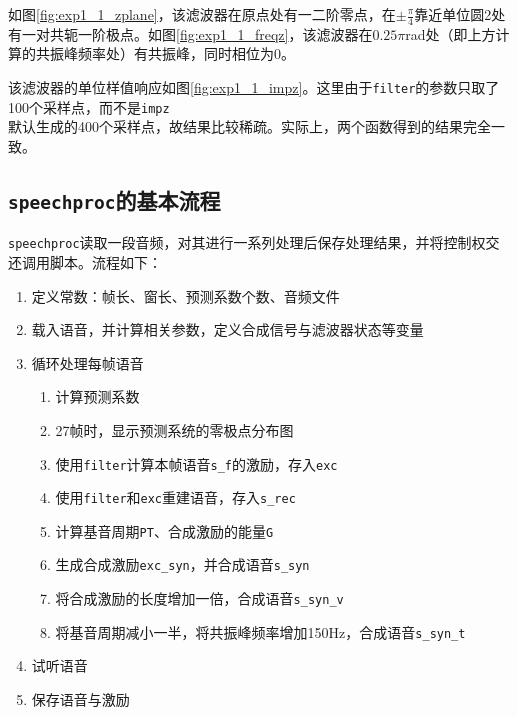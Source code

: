\documentclass[10pt, a4paper]{article}
\begin{document}
如图\ref{fig:exp1_1_zplane}，该滤波器在原点处有一二阶零点，在$\pm\frac{\pi}{4}$靠近单位圆2处有一对共轭一阶极点。如图\ref{fig:exp1_1_freqz}，该滤波器在$0.25\pi$rad处（即上方计算的共振峰频率处）有共振峰，同时相位为0。

该滤波器的单位样值响应如图\ref{fig:exp1_1_impz}。这里由于\texttt{filter}的参数只取了100个采样点，而不是\texttt{impz}\\默认生成的400个采样点，故结果比较稀疏。实际上，两个函数得到的结果完全一致。

\subsection{\texttt{speechproc}的基本流程}

\texttt{speechproc}读取一段音频，对其进行一系列处理后保存处理结果，并将控制权交还调用脚本。流程如下：

\begin{enumerate}
    \item 定义常数：帧长、窗长、预测系数个数、音频文件
    \item 载入语音，并计算相关参数，定义合成信号与滤波器状态等变量
    \item 循环处理每帧语音
          \begin{enumerate}
              \item 计算预测系数
              \item 27帧时，显示预测系统的零极点分布图
              \item 使用\texttt{filter}计算本帧语音\texttt{s_f}的激励，存入\texttt{exc}
              \item 使用\texttt{filter}和\texttt{exc}重建语音，存入\texttt{s_rec}
              \item 计算基音周期\texttt{PT}、合成激励的能量\texttt{G}
              \item 生成合成激励\texttt{exc_syn}，并合成语音\texttt{s_syn}
              \item 将合成激励的长度增加一倍，合成语音\texttt{s_syn_v}
              \item 将基音周期减小一半，将共振峰频率增加150Hz，合成语音\texttt{s_syn_t}
          \end{enumerate}
    \item 试听语音
    \item 保存语音与激励
\end{enumerate}
\end{document}

